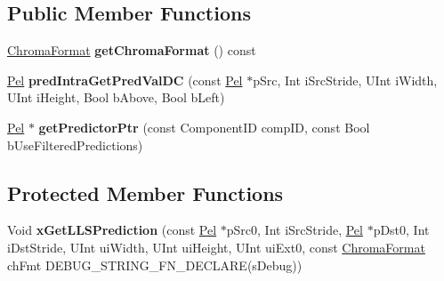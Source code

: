 \subsection*{Public Member Functions}
\begin{DoxyCompactItemize}
\item 
\mbox{\label{class_t_com_prediction_aa748b39ae8eec82b420f14bbaa9f6247}} 
\hyperlink{_type_def_8h_a4a6c51c10f2eb04abc7209db7caff39f}{Chroma\+Format} {\bfseries get\+Chroma\+Format} () const
\item 
\mbox{\label{class_t_com_prediction_a1f488c406d98b7021911fff473ab4f6f}} 
\hyperlink{_type_def_8h_af92141699657699b4b547be0c8517541}{Pel} {\bfseries pred\+Intra\+Get\+Pred\+Val\+DC} (const \hyperlink{_type_def_8h_af92141699657699b4b547be0c8517541}{Pel} $\ast$p\+Src, Int i\+Src\+Stride, U\+Int i\+Width, U\+Int i\+Height, Bool b\+Above, Bool b\+Left)
\item 
\mbox{\label{class_t_com_prediction_a0dfab5a7f1128873d83771268eb59c28}} 
\hyperlink{_type_def_8h_af92141699657699b4b547be0c8517541}{Pel} $\ast$ {\bfseries get\+Predictor\+Ptr} (const Component\+ID comp\+ID, const Bool b\+Use\+Filtered\+Predictions)
\end{DoxyCompactItemize}
\subsection*{Protected Member Functions}
\begin{DoxyCompactItemize}
\item 
\mbox{\label{class_t_com_prediction_a8c6f0c257e0a12a1c91af172e8620afc}} 
Void {\bfseries x\+Get\+L\+L\+S\+Prediction} (const \hyperlink{_type_def_8h_af92141699657699b4b547be0c8517541}{Pel} $\ast$p\+Src0, Int i\+Src\+Stride, \hyperlink{_type_def_8h_af92141699657699b4b547be0c8517541}{Pel} $\ast$p\+Dst0, Int i\+Dst\+Stride, U\+Int ui\+Width, U\+Int ui\+Height, U\+Int ui\+Ext0, const \hyperlink{_type_def_8h_a4a6c51c10f2eb04abc7209db7caff39f}{Chroma\+Format} ch\+Fmt D\+E\+B\+U\+G\+\_\+\+S\+T\+R\+I\+N\+G\+\_\+\+F\+N\+\_\+\+D\+E\+C\+L\+A\+RE(s\+Debug))
\end{DoxyCompactItemize}
